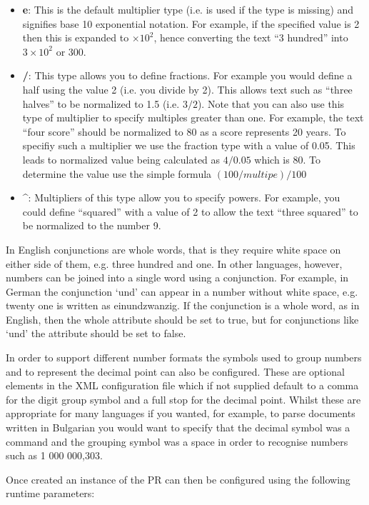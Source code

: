 \begin{itemize}
\item \textbf{e}: This is the default multiplier type (i.e. is used if the type
is missing) and signifies base 10 exponential notation. For example, if the specified
value is 2 then this is expanded to $\times 10^2$, hence converting the text ``3 hundred'' into
$3 \times 10^2$ or 300.
\item \textbf{/}: This type allows you to define fractions. For example you would define a half using the value 2 (i.e.
you divide by 2). This allows text such as ``three halves'' to be normalized to 1.5 (i.e. $3/2$). Note that
you can also use this type of multiplier to specify multiples greater than one. For example, the text ``four score''
should be normalized to 80 as a score represents 20 years. To specifiy such a multiplier we use the fraction type
with a value of 0.05. This leads to normalized value being calculated as $4/0.05$ which is 80. To determine the
value use the simple formula $(100/multipe)/100$
\item \textbf{\^}: Multipliers of this type allow you to specify powers. For example, you could define ``squared'' with
a value of 2 to allow the text ``three squared'' to be normalized to the number 9.
\end{itemize}

In English conjunctions
are whole words, that is they require white space on either side of them, e.g.
three hundred and one. In other languages, however, numbers can be joined into a
single word using a conjunction. For example, in German the conjunction `und'
can appear in a number without white space, e.g. twenty one is written as
einundzwanzig. If the conjunction is a whole word, as in English, then the whole
attribute should be set to true, but for conjunctions like `und' the attribute
should be set to false.

In order to support different number formats the symbols used to group numbers
and to represent the decimal point can also be configured. These are optional
elements in the XML configuration file which if not supplied default to a comma
for the digit group symbol and a full stop for the decimal point. Whilst these
are appropriate for many languages if you wanted, for example, to parse
documents written in Bulgarian you would want to specify that the decimal symbol
was a command and the grouping symbol was a space in order to recognise numbers
such as 1 000 000,303.

Once created an instance of the PR can then be configured using the following
runtime parameters:

